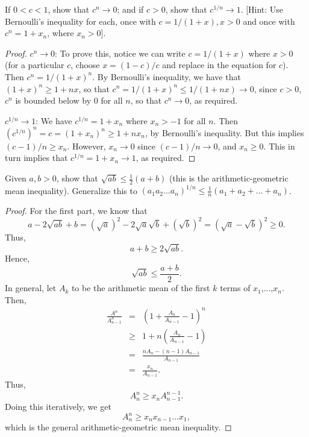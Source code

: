 \begin{exercise}{19}
If $0<c<1$, show that $c^n\to 0$; and if $c>0$, show that $c^{1/n}\to 1$. [Hint: Use Bernoulli's inequality for each, once with $c=1/(1+x), x>0$ and once with $c^n=1+x_n$, where $x_n>0$].
\end{exercise}
\begin{proof}
$c^n\to 0$: To prove this, notice we can write $c=1/(1+x)$ where $x>0$ (for a particular $c$, choose $x=(1-c)/c$ and replace in the equation for $c$). Then $c^n= 1/(1+x)^n$. By Bernoulli's inequality, we have that $(1+x)^n\geq 1+nx$, so that $c^n= 1/(1+x)^n\leq 1/(1+nx)\to 0$, since $c>0$, $c^n$ is bounded below by 0 for all $n$, so that $c^n\to 0$, as required.

$c^{1/n}\to 1$: We have $c^{1/n}= 1+x_n$ where $x_n>-1$ for all $n$. Then $(c^{1/n})^n= c= (1+x_n)^n\geq 1+nx_n$, by Bernoulli's inequality. But this implies $(c-1)/n\geq x_n$. However, $x_n\to 0$ since $(c-1)/n\to 0$, and $x_n\geq 0$. This in turn implies that $c^{1/n}= 1+x_n\to 1$, as required.
\end{proof}

\begin{exercise}{20}
Given $a,b>0$, show that $\sqrt{ab}\leq \frac{1}{2}(a+b)$ (this is the arithmetic-geometric mean inequality). Generalize this to $(a_1a_2...a_n)^{1/n}\leq \frac{1}{n}(a_1+a_2+...+a_n)$.
\end{exercise}
\begin{proof}
    For the first part, we know that
    $$a - 2\sqrt{ab} + b = (\sqrt{a})^2 - 2\sqrt{a}\sqrt{b} + (\sqrt{b})^2 = (\sqrt{a}-\sqrt{b})^2 \geq 0.$$
    Thus,
    $$a + b \geq 2\sqrt{ab}.$$
    Hence,
    $$\sqrt{ab}\leq \frac{a+b}{2}.$$
    In general, let $A_k$ to be the arithmetic mean of the first $k$ terms of $x_1$,...,$x_n$. Then,
    \begin{eqnarray*}
        \frac{A^n}{A_{n-1}^n}
        & = & \left(1 + \frac{A_n}{A_{n-1}} - 1\right)^n\\
        & \geq & 1 + n\left(\frac{A_n}{A_{n-1}} - 1\right)\\
        & = & \frac{nA_n - (n-1) A_{n-1}}{A_{n-1}}\\
        & = & \frac{x_n}{A_{n-1}}.
    \end{eqnarray*}
    Thus,
    $$A_n^n\geq x_n A_{n-1}^{n-1}.$$
    Doing this iteratively, we get
    $$A_n^n\geq x_n x_{n-1} ... x_1,$$
    which is the general arithmetic-geometric mean inequality.
\end{proof}

